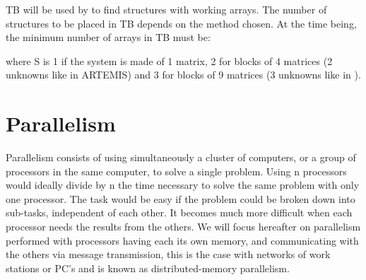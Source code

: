 TB will be used by  to find  structures with
working arrays. The number of structures to be placed in TB depends on the
method chosen. At the time being, the minimum number of arrays in TB must be:

 where S is 1 if the system is made of 1
  matrix, 2 for blocks of 4 matrices (2 unknowns like in ARTEMIS) and 3 for
  blocks of 9 matrices (3 unknowns like in ).

\section{Parallelism}

Parallelism consists of using simultaneously a cluster of computers, or a group
of processors in the same computer, to solve a single problem. Using n
processors would ideally divide by n the time necessary to solve the same
problem with only one processor. The task would be easy if the problem could be
broken down into sub-tasks, independent of each other. It becomes much more
difficult when each processor needs the results from the others. We will focus
hereafter on parallelism performed with processors having each its own memory,
and communicating with the others via message transmission, this is the case
with networks of work stations or PC's and is known as distributed-memory
parallelism.


